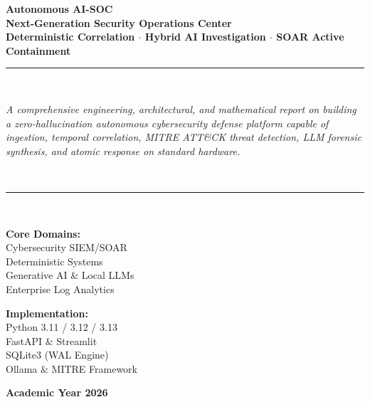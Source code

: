 \documentclass[11pt,a4paper]{article}
\begin{document}
\begin{titlepage}
    \centering
    \vspace*{1.5cm}
    
    {\Huge \bfseries \color{primaryblue} Autonomous AI-SOC}\\[0.4cm]
    {\Large \bfseries \color{deepblue} Next-Generation Security Operations Center}\\[0.3cm]
    {\normalsize \color{accentblue} \textbf{Deterministic Correlation $\cdot$ Hybrid AI Investigation $\cdot$ SOAR Active Containment}}\\[1.5cm]
    
    \rule{\textwidth}{1.2pt}\\[0.8cm]
    
    \begin{minipage}{0.9\textwidth}
        \centering
        \textit{A comprehensive engineering, architectural, and mathematical report on building a zero-hallucination autonomous cybersecurity defense platform capable of ingestion, temporal correlation, MITRE ATT\&CK threat detection, LLM forensic synthesis, and atomic response on standard hardware.}
    \end{minipage}\\[1cm]
    
    \rule{\textwidth}{1.2pt}\\[2cm]
    
    \begin{minipage}{0.48\textwidth}
        \begin{flushleft} \large
            \textbf{Core Domains:}\\
            Cybersecurity SIEM/SOAR\\
            Deterministic Systems\\
            Generative AI \& Local LLMs\\
            Enterprise Log Analytics
        \end{flushleft}
    \end{minipage}
    \begin{minipage}{0.48\textwidth}
        \begin{flushright} \large
            \textbf{Implementation:}\\
            Python 3.11 / 3.12 / 3.13\\
            FastAPI \& Streamlit\\
            SQLite3 (WAL Engine)\\
            Ollama \& MITRE Framework
        \end{flushright}
    \end{minipage}
    
    \vfill
    {\large \textbf{Academic Year 2026}}
\end{titlepage}
\end{document}
